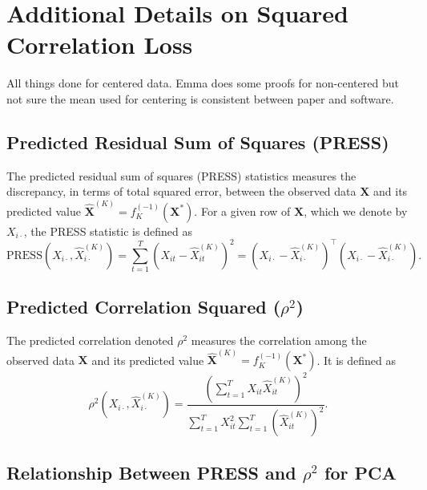 \section{Additional Details on Squared Correlation Loss} \label{sec:squared-correlation}

All things done for centered data. Emma does some proofs for non-centered but not sure the mean used for centering is consistent between paper and software.

\subsection{Predicted Residual Sum of Squares (PRESS)}

The predicted residual sum of squares (PRESS) statistics measures the discrepancy, in terms of total squared error, between the observed data $\mathbf{X}$ and its predicted value $\widehat{\mathbf{X}}^{(K)} = f^{(-1)}_K(\mathbf{X}^*)$. For a given row of $\mathbf{X}$, which we denote by $X_{i\cdot}$, the PRESS statistic is defined as
$$
\text{PRESS}\left(X_{i\cdot}, \widehat{X}^{(K)}_{i\cdot}\right) = \sum_{t = 1}^T \left(X_{it} - \widehat{X}^{(K)}_{it}\right)^2 = \left(X_{i\cdot} - \widehat{X}^{(K)}_{i\cdot}\right)^\top \left(X_{i\cdot} - \widehat{X}^{(K)}_{i\cdot}\right).
$$

\subsection{Predicted Correlation Squared ($\rho^2$)}

The predicted correlation denoted $\rho^2$ measures the correlation among the observed data $\mathbf{X}$ and its predicted value $\widehat{\mathbf{X}}^{(K)} = f^{(-1)}_K(\mathbf{X}^*)$. It is defined as
$$
\rho^2 \left(X_{i\cdot}, \widehat{X}^{(K)}_{i\cdot}\right) =
\frac{\left(\sum_{t = 1}^T X_{it}\widehat{X}^{(K)}_{it}\right)^2}{\sum_{t = 1}^T X_{it}^2\sum_{t = 1}^T\left(\widehat{X}^{(K)}_{it}\right)^2}.
$$

\subsection{Relationship Between PRESS and $\rho^2$ for PCA}

